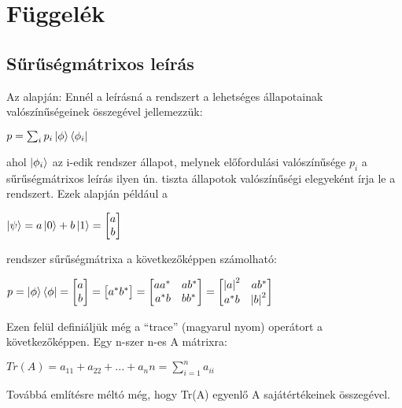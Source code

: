 \appendix
\chapter*{Függelék}

\setcounter{chapter}{6}  %
\setcounter{equation}{0} %

\section{Sűrűségmátrixos leírás} \label{suru}

Az \cite{kvantkonyv2} alapján:
Ennél a leírásná a rendszert a lehetséges állapotainak valószínűségeinek összegével jellemezzük:
\begin{center}
$ p=\sum_i p_i \ket{\phi}\bra{\phi_i} $
\end{center}
ahol $ \ket{\phi_i} $ az i-edik rendszer állapot, melynek előfordulási valószínűsége $ p_i $ a sűrűségmátrixos leírás ilyen ún. tiszta állapotok valószínűségi elegyeként írja le a rendszert. Ezek alapján például a 
\begin{center}
$ \ket{\psi}=a\ket{0}+b\ket{1}= \begin{bmatrix} a\\b \end{bmatrix} $
\end{center}
rendszer sűrűségmátrixa a következőképpen számolható:
\begin{center}
$ p= \ket{\phi}\bra{\phi} = \begin{bmatrix} a \\ b \end{bmatrix} = \begin{bmatrix} a^* b^* \end{bmatrix}= \begin{bmatrix} aa^*\quad  ab^*\\a^*b \quad bb^* \end{bmatrix} = \begin{bmatrix} \abs{a}^2 \quad ab^* \\ a^*b \quad \abs{b}^2 \end{bmatrix} $
\end{center}
Ezen felül definiáljük még a “trace” (magyarul nyom) operátort a következőképpen. Egy n-szer n-es A mátrixra:
\begin{center}
$ Tr(A) = a_{11}+a_{22}+... +a_nn= \sum_{i=1}^n a_{ii} $
\end{center}
Továbbá említésre méltó még, hogy Tr(A) egyenlő A sajátértékeinek összegével.

